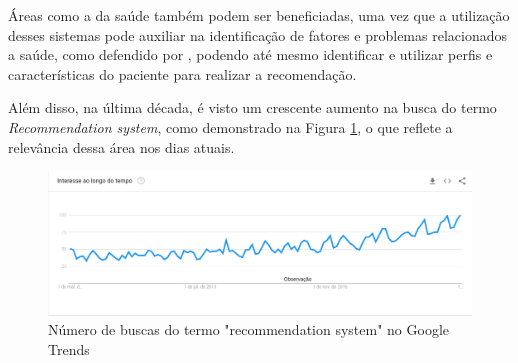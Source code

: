 Áreas como a da saúde também podem ser beneficiadas, uma vez que a utilização desses sistemas pode auxiliar na identificação de fatores e problemas relacionados a saúde, como defendido por , podendo até mesmo identificar e utilizar perfis e características do paciente para realizar a recomendação.

Além disso, na última década, é visto um crescente aumento na busca do termo \textit{Recommendation system}, como demonstrado na Figura \ref{fig:googletrends}, o que reflete a relevância dessa área nos dias atuais.

\begin{figure}[H]
	\centering
	\includegraphics[width=1\linewidth]{imagens/googletrends.png}
	\caption[Número de buscas do termo recommendation system]{Número de buscas do termo "recommendation system" no Google Trends}
	\label{fig:googletrends}
\end{figure}

\nocite{googletrends}